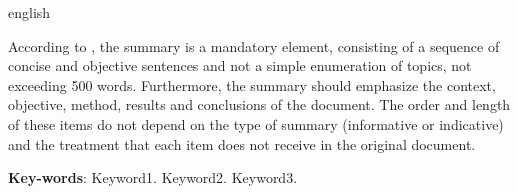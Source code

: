 \documentclass[
	12pt,				    %
	openright,			    %
	oneside,			    %
	a4paper,			    %
    sumario=tradicional,    %
	english,			    %
	brazil,				    %
	]{abntex2}
\let\cite\parencite
\begin{document}
\begin{resumo}[Abstract]
 \begin{otherlanguage*}{english}
   \noindent
   
   According to \cite{NBR6028:2003}, the summary is a mandatory element, consisting of a sequence of concise and objective sentences and not a simple enumeration of topics, not exceeding 500 words. Furthermore, the summary should emphasize the context, objective, method, results and conclusions of the document. The order and length of these items do not depend on the type of summary (informative or indicative) and the treatment that each item does not receive in the original document.
   
   \vspace{\onelineskip}

   \noindent
   \textbf{Key-words}: Keyword1. Keyword2. Keyword3.
 \end{otherlanguage*}
\end{resumo}


\listoffigures*
\cleardoublepage

\listoftables*
\cleardoublepage

\listofquadros*
\cleardoublepage





\tableofcontents*
\cleardoublepage
\end{document}
